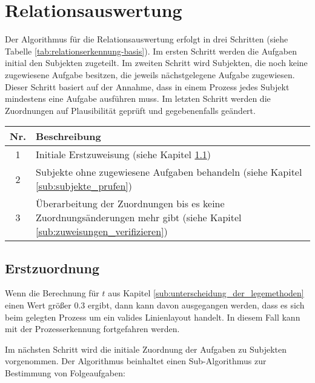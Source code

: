 \section{Relationsauswertung} %
\label{sub:relationsauswertung}
Der Algorithmus für die Relationsauswertung erfolgt in drei Schritten (siehe Tabelle \ref{tab:relationserkennung-basis}). Im ersten Schritt werden die Aufgaben initial den Subjekten zugeteilt. Im zweiten Schritt wird Subjekten, die noch keine zugewiesene Aufgabe besitzen, die jeweils nächstgelegene Aufgabe zugewiesen. Dieser Schritt basiert auf der Annahme, dass in einem Prozess jedes Subjekt mindestens eine Aufgabe ausführen muss. Im letzten Schritt werden die Zuordnungen auf Plausibilität geprüft und gegebenenfalls geändert.

\begin{center}
	\label{tab:relationserkennung-basis}
	\begin{tabularx}
		{1.0\linewidth}{ c X } \textbf{Nr.} & \textbf{Beschreibung} \\
		\hline 1 & Initiale Erstzuweisung (siehe Kapitel \ref{sub:erstzuordnung}) \\
		\hline 2 & Subjekte ohne zugewiesene Aufgaben behandeln (siehe Kapitel \ref{sub:subjekte_prufen}) \\
		\hline 3 & Überarbeitung der Zuordnungen bis es keine Zuordnungsänderungen mehr gibt (siehe Kapitel \ref{sub:zuweisungen_verifizieren})\\
	\end{tabularx}
\end{center}

\subsection{Erstzuordnung} %
\label{sub:erstzuordnung}
Wenn die Berechnung für $t$ aus Kapitel \ref{sub:unterscheidung_der_legemethoden} einen Wert größer $0.3$ ergibt, dann kann davon ausgegangen werden, dass es sich beim gelegten Prozess um ein valides Linienlayout handelt. In diesem Fall kann mit der Prozesserkennung fortgefahren werden.

Im nächsten Schritt wird die initiale Zuordnung der Aufgaben zu Subjekten vorgenommen. Der Algorithmus beinhaltet einen Sub-Algorithmus zur Bestimmung von Folgeaufgaben:
 
